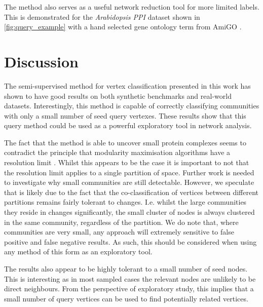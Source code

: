 \documentclass[sigconf]{acmart}
\begin{document}
The method also serves as a useful network reduction tool for more limited labels.
This is demonstrated for the \textit{Arabidopsis PPI} dataset shown in \ref{fig:query_example} with a hand selected gene ontology term from AmiGO \cite{carbon2008amigo}.

\section{Discussion}
The semi-supervised method for vertex classification presented in this work has shown to have good results on both synthetic benchmarks and real-world datasets.
Interestingly, this method is capable of correctly classifying communities with only a small number of seed query vertexes.
These results show that this query method could be used as a powerful exploratory tool in network analysis.

The fact that the method is able to uncover small protein complexes seems to contradict the principle that modularity maximisation algorithms have a resolution limit \cite{fortunato2007resolution}.
Whilst this appears to be the case it is important to not that the resolution limit applies to a single partition of space.
Further work is needed to investigate why small communities are still detectable.
However, we speculate that is likely due to the fact that the co-classification of vertices between different partitions remains fairly tolerant to changes.
I.e. whilst the large communities they reside in changes significantly, the small cluster of nodes is always clustered in the same community, regardless of the partition.
We do note that, where communities are very small, any approach will extremely sensitive to false positive and false negative results.
As such, this should be considered when using any method of this form as an exploratory tool.

The results also appear to be highly tolerant to a small number of seed nodes.
This is interesting as in most sampled cases the relevant nodes are unlikely to be direct neighbours.
From the perspective of exploratory study, this implies that a small number of query vertices can be used to find potentially related vertices.
\end{document}

